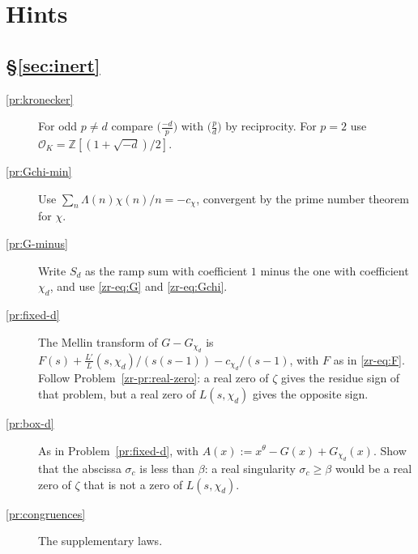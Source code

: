 \documentclass[reqno]{amsart}
\theoremstyle{definition}
\theoremstyle{plain}
\theoremstyle{remark}
\newcommand{\Z}{\mathbb{Z}}
\begin{document}
\section*{Hints}

\subsection*{\S\ref{sec:inert}}
\begin{description}
\item[\ref{pr:kronecker}] For odd $p \ne d$ compare $\bigl(\frac{-d}{p}\bigr)$ with $\bigl(\frac{p}{d}\bigr)$ by reciprocity.  For $p = 2$ use $\mathcal{O}_K = \Z[(1 + \sqrt{-d})/2]$.
\item[\ref{pr:Gchi-min}] Use $\sum_n \Lambda(n)\chi(n)/n = -c_\chi$, convergent by the prime number theorem for $\chi$.
\item[\ref{pr:G-minus}] Write $S_d$ as the ramp sum with coefficient $1$ minus the one with coefficient $\chi_d$, and use \eqref{zr-eq:G} and \eqref{zr-eq:Gchi}.
\item[\ref{pr:fixed-d}] The Mellin transform of $G - G_{\chi_d}$ is $F(s) + \frac{L'}{L}(s, \chi_d)/(s(s-1)) - c_{\chi_d}/(s-1)$, with $F$ as in \eqref{zr-eq:F}.  Follow Problem~\ref{zr-pr:real-zero}: a real zero of $\zeta$ gives the residue sign of that problem, but a real zero of $L(s, \chi_d)$ gives the opposite sign.
\item[\ref{pr:box-d}] As in Problem~\ref{pr:fixed-d}, with $A(x) := x^\theta - G(x) + G_{\chi_d}(x)$.  Show that the abscissa $\sigma_c$ is less than $\beta$: a real singularity $\sigma_c \ge \beta$ would be a real zero of $\zeta$ that is not a zero of $L(s, \chi_d)$.
\item[\ref{pr:congruences}] The supplementary laws.
\end{description}
\end{document}
